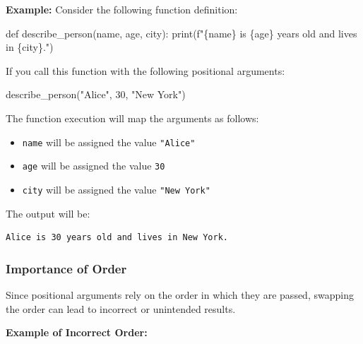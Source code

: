 \documentclass[
  letterpaper,
  DIV=11,
  numbers=noendperiod]{scrreprt}
\newenvironment{Shaded}{\begin{snugshade}}{\end{snugshade}}
\newcommand{\BuiltInTok}[1]{\textcolor[rgb]{0.00,0.23,0.31}{#1}}
\newcommand{\DecValTok}[1]{\textcolor[rgb]{0.68,0.00,0.00}{#1}}
\newcommand{\KeywordTok}[1]{\textcolor[rgb]{0.00,0.23,0.31}{#1}}
\newcommand{\NormalTok}[1]{\textcolor[rgb]{0.00,0.23,0.31}{#1}}
\newcommand{\SpecialCharTok}[1]{\textcolor[rgb]{0.37,0.37,0.37}{#1}}
\newcommand{\SpecialStringTok}[1]{\textcolor[rgb]{0.13,0.47,0.30}{#1}}
\newcommand{\StringTok}[1]{\textcolor[rgb]{0.13,0.47,0.30}{#1}}
\providecommand{\tightlist}{%
  \setlength{\itemsep}{0pt}\setlength{\parskip}{0pt}}\usepackage{longtable,booktabs,array}
\begin{document}
\textbf{Example:} Consider the following function definition:

\begin{Shaded}
\begin{Highlighting}[]
\KeywordTok{def}\NormalTok{ describe\_person(name, age, city):}
    \BuiltInTok{print}\NormalTok{(}\SpecialStringTok{f"}\SpecialCharTok{\{}\NormalTok{name}\SpecialCharTok{\}}\SpecialStringTok{ is }\SpecialCharTok{\{}\NormalTok{age}\SpecialCharTok{\}}\SpecialStringTok{ years old and lives in }\SpecialCharTok{\{}\NormalTok{city}\SpecialCharTok{\}}\SpecialStringTok{."}\NormalTok{)}
\end{Highlighting}
\end{Shaded}

If you call this function with the following positional arguments:

\begin{Shaded}
\begin{Highlighting}[]
\NormalTok{describe\_person(}\StringTok{"Alice"}\NormalTok{, }\DecValTok{30}\NormalTok{, }\StringTok{"New York"}\NormalTok{)}
\end{Highlighting}
\end{Shaded}

The function execution will map the arguments as follows:

\begin{itemize}
\tightlist
\item
  \texttt{name} will be assigned the value \texttt{"Alice"}
\item
  \texttt{age} will be assigned the value \texttt{30}
\item
  \texttt{city} will be assigned the value \texttt{"New\ York"}
\end{itemize}

The output will be:

\begin{verbatim}
Alice is 30 years old and lives in New York.
\end{verbatim}

\hypertarget{importance-of-order}{%
\subsubsection{Importance of Order}\label{importance-of-order}}

Since positional arguments rely on the order in which they are passed,
swapping the order can lead to incorrect or unintended results.

\textbf{Example of Incorrect Order:}
\end{document}
